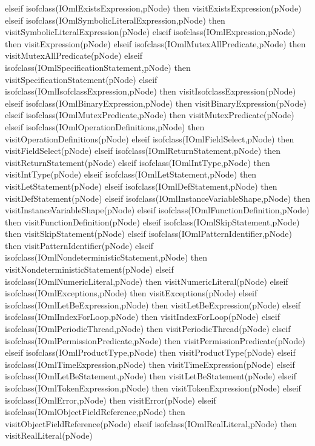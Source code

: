 \begin{vdm_al}
      elseif isofclass(IOmlExistsExpression,pNode) then visitExistsExpression(pNode)
      elseif isofclass(IOmlSymbolicLiteralExpression,pNode) then visitSymbolicLiteralExpression(pNode)
      elseif isofclass(IOmlExpression,pNode) then visitExpression(pNode)
      elseif isofclass(IOmlMutexAllPredicate,pNode) then visitMutexAllPredicate(pNode)
      elseif isofclass(IOmlSpecificationStatement,pNode) then visitSpecificationStatement(pNode)
      elseif isofclass(IOmlIsofclassExpression,pNode) then visitIsofclassExpression(pNode)
      elseif isofclass(IOmlBinaryExpression,pNode) then visitBinaryExpression(pNode)
      elseif isofclass(IOmlMutexPredicate,pNode) then visitMutexPredicate(pNode)
      elseif isofclass(IOmlOperationDefinitions,pNode) then visitOperationDefinitions(pNode)
      elseif isofclass(IOmlFieldSelect,pNode) then visitFieldSelect(pNode)
      elseif isofclass(IOmlReturnStatement,pNode) then visitReturnStatement(pNode)
      elseif isofclass(IOmlIntType,pNode) then visitIntType(pNode)
      elseif isofclass(IOmlLetStatement,pNode) then visitLetStatement(pNode)
      elseif isofclass(IOmlDefStatement,pNode) then visitDefStatement(pNode)
      elseif isofclass(IOmlInstanceVariableShape,pNode) then visitInstanceVariableShape(pNode)
      elseif isofclass(IOmlFunctionDefinition,pNode) then visitFunctionDefinition(pNode)
      elseif isofclass(IOmlSkipStatement,pNode) then visitSkipStatement(pNode)
      elseif isofclass(IOmlPatternIdentifier,pNode) then visitPatternIdentifier(pNode)
      elseif isofclass(IOmlNondeterministicStatement,pNode) then visitNondeterministicStatement(pNode)
      elseif isofclass(IOmlNumericLiteral,pNode) then visitNumericLiteral(pNode)
      elseif isofclass(IOmlExceptions,pNode) then visitExceptions(pNode)
      elseif isofclass(IOmlLetBeExpression,pNode) then visitLetBeExpression(pNode)
      elseif isofclass(IOmlIndexForLoop,pNode) then visitIndexForLoop(pNode)
      elseif isofclass(IOmlPeriodicThread,pNode) then visitPeriodicThread(pNode)
      elseif isofclass(IOmlPermissionPredicate,pNode) then visitPermissionPredicate(pNode)
      elseif isofclass(IOmlProductType,pNode) then visitProductType(pNode)
      elseif isofclass(IOmlTimeExpression,pNode) then visitTimeExpression(pNode)
      elseif isofclass(IOmlLetBeStatement,pNode) then visitLetBeStatement(pNode)
      elseif isofclass(IOmlTokenExpression,pNode) then visitTokenExpression(pNode)
      elseif isofclass(IOmlError,pNode) then visitError(pNode)
      elseif isofclass(IOmlObjectFieldReference,pNode) then visitObjectFieldReference(pNode)
      elseif isofclass(IOmlRealLiteral,pNode) then visitRealLiteral(pNode)

\end{vdm_al}
